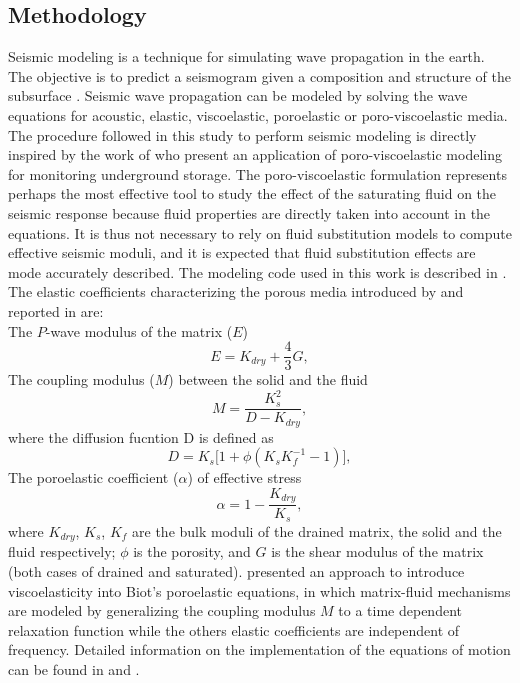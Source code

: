 \subsection{Methodology}
Seismic modeling is a technique for simulating wave propagation in the earth.
The objective is to predict a seismogram given a composition and structure of
the subsurface \citep{Carcione2010}. Seismic wave propagation can be modeled by
solving the wave equations for acoustic, elastic, viscoelastic, poroelastic or
poro-viscoelastic media. The procedure followed in this study to perform seismic
modeling is directly inspired by the work of \citet{Carcione2006} who present an
application of poro-viscoelastic modeling for monitoring underground 
storage. The poro-viscoelastic formulation represents perhaps the most effective
tool to study the effect of the saturating fluid on the seismic response because
fluid properties are directly taken into account in the equations. It is thus
not necessary to rely on fluid substitution models to compute effective seismic
moduli, and it is expected that fluid substitution effects are mode accurately
described. The modeling code used in this work is described in
\citet{Giroux2012}.\\
The elastic coefficients characterizing the porous media introduced by
\citet{Biot1957} and reported in \citet{Carcione1998} are:\\
The $P$-wave modulus of the matrix ($E$)
\begin{equation}
E = K_{dry} + \dfrac{4}{3}G,
\end{equation}
The coupling modulus ($M$) between the solid and the fluid
\begin{equation}
M = \dfrac{K_{s}^{2}}{D-K_{dry}} ,
\end{equation}
where the diffusion fucntion D is defined as
\begin{equation}
D = K_s \big[1 + \phi(K_s K_{f}^{-1} -1)\big],
\end{equation}
The poroelastic coefficient ($\alpha$) of effective stress
\begin{equation}
 \alpha = 1 - \dfrac{K_{dry}}{K_s},
\end{equation}
where $K_{dry}$, $K_s$, $K_f$ are the bulk moduli of the drained matrix, the
solid and the fluid respectively; $\phi$ is the porosity, and $G$ is the shear
modulus of the matrix (both cases of drained and saturated).
 \citet{Carcione1998} presented an approach to introduce viscoelasticity into
Biot's poroelastic equations, in which matrix-fluid mechanisms are modeled by
generalizing the coupling modulus $M$ to a time dependent relaxation function
while the others elastic coefficients are independent of frequency. Detailed
information on the implementation of the equations of motion can be found in
\citet{Carcione1998} and \citet{Carcione1999}.
